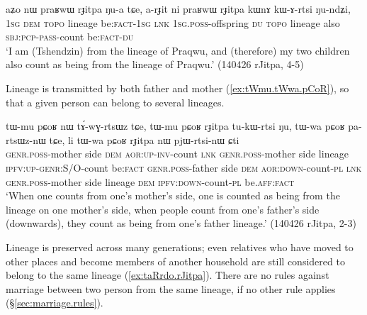 \begin{exe}
\ex \label{ex:praRwW.rJitpa}
\gll   aʑo nɯ praʁwɯ rɟitpa ŋu-a tɕe, a-rɟit ni praʁwɯ rɟitpa kɯnɤ kɯ-ɤ-rtsi ŋu-ndʑi, \\
\textsc{1sg} \textsc{dem}  \textsc{topo} lineage be:\textsc{fact}-\textsc{1sg} \textsc{lnk} \textsc{1sg}.\textsc{poss}-offspring \textsc{du}  \textsc{topo} lineage also \textsc{sbj}:\textsc{pcp}-\textsc{pass}-count be:\textsc{fact}-\textsc{du} \\
\glt  `I am (Tshendzin) from the lineage of Praqwu, and (therefore) my two children also count as being from the lineage of Praqwu.' (140426 rJitpa, 4-5)
\end{exe}

Lineage is transmitted by both father and mother (\ref{ex:tWmu.tWwa.pCoR}), so that a given person can belong to several lineages.

\begin{exe}
\ex \label{ex:tWmu.tWwa.pCoR}
\gll   tɯ-mu pɕoʁ nɯ tɤ́-wɣ-rtsɯz tɕe, tɯ-mu pɕoʁ rɟitpa tu-kɯ-rtsi ŋu, tɯ-wa pɕoʁ pa-rtsɯz-nɯ tɕe, li tɯ-wa pɕoʁ rɟitpa nɯ pjɯ-rtsi-nɯ ɕti   \\
\textsc{genr}.\textsc{poss}-mother side \textsc{dem} \textsc{aor}:\textsc{up}-\textsc{inv}-count \textsc{lnk} \textsc{genr}.\textsc{poss}-mother side lineage \textsc{ipfv}:\textsc{up}-\textsc{genr}:S/O-count be:\textsc{fact}  \textsc{genr}.\textsc{poss}-father side \textsc{dem} \textsc{aor}:\textsc{down}-count-\textsc{pl} \textsc{lnk} \textsc{genr}.\textsc{poss}-mother side lineage \textsc{dem} \textsc{ipfv}:\textsc{down}-count-\textsc{pl} be.\textsc{aff}:\textsc{fact}  \\
\glt  `When one counts from  one's mother's side, one is counted as being from the lineage on one mother's side, when people count from one's father's side (downwards), they count as being from one's father lineage.' (140426 rJitpa, 2-3)
 \end{exe}

Lineage is preserved across many generations; even relatives who have moved to other places and become members of another household are still considered to belong to the same lineage (\ref{ex:taRrdo.rJitpa}). There are no rules against marriage between two person from the same lineage, if no other rule applies (§\ref{sec:marriage.rules}).

